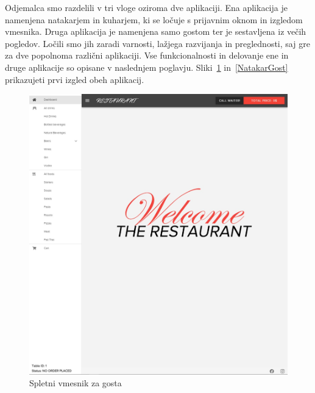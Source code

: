 \documentclass[a4paper, 12pt]{book}
\begin{document}
Odjemalca smo razdelili v tri vloge oziroma dve aplikaciji. Ena aplikacija je namenjena natakarjem in kuharjem, ki se ločuje s prijavnim oknom in izgledom vmesnika. Druga aplikacija je namenjena samo gostom ter je sestavljena iz večih pogledov. Ločili smo jih zaradi varnosti, lažjega razvijanja in preglednosti, saj gre za dve popolnoma različni aplikaciji. Vse funkcionalnosti in delovanje ene in druge aplikacije so opisane v naslednjem poglavju. Sliki~\ref{Gost} in~\ref{NatakarGost} prikazujeti prvi izgled obeh aplikacij.

\begin{figure}[!htb]
\begin{center}
\includegraphics[width=12.5cm]{gost_1.jpg}
\caption{Spletni vmesnik za gosta}
\label{Gost}
\end{center}
\end{figure}
\end{document}
